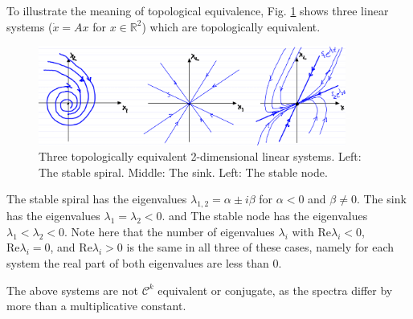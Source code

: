 \begin{ex}[Topologically equivalent linear systems for $n=2$]
	To illustrate the meaning of topological equivalence, Fig. \ref{fig:topo_equiv} shows three linear systems ($\dot{{x} } = {Ax}  $ for $x\in \mathbb{R}^2$) which are topologically equivalent.
	\begin{figure}[h!]
		\centering
		\includegraphics[width=0.9\textwidth]{figures/ch2/13topo_equiv.png}
		\caption{Three topologically equivalent 2-dimensional linear systems. Left: The stable spiral. Middle: The sink. Left: The stable node.}
		\label{fig:topo_equiv}
	\end{figure}

The stable spiral has the eigenvalues $\lambda _{1,2}= \alpha \pm i \beta $ for $\alpha <0$ and $\beta \neq 0$. The sink has the eigenvalues $\lambda_1=\lambda_2<0$. and The stable node has the eigenvalues $\lambda_1 < \lambda_2 < 0$. Note here that the number of eigenvalues $\lambda_i$ with $ \textrm{Re} \lambda_i <0$, $ \textrm{Re} \lambda _i=0$, and $ \textrm{Re} \lambda _i>0$ is the same in all three of these cases, namely for each system the real part of both eigenvalues are less than 0.	
\end{ex}

\begin{remark}[]
	The above systems are not $\mathcal{C}^k$ equivalent or conjugate, as the spectra differ by more than a multiplicative constant.
\end{remark}


